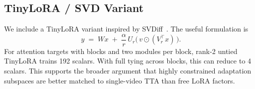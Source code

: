 \subsection{TinyLoRA / SVD Variant}
\label{sec:method_tinylora}

We include a TinyLoRA variant inspired by SVDiff~\citep{han2023svdiff}. The
useful formulation is
\begin{equation}
  y \;=\; Wx \;+\; \frac{\alpha}{r}\, U_r \bigl(\,v \odot (V_r^\top x)\,\bigr).
  \label{eq:tinylora}
\end{equation}
For \backbone attention targets with \nblocks blocks and two modules per block,
rank-2 untied TinyLoRA trains 192 scalars. With full tying across blocks, this
can reduce to 4 scalars. This supports the broader argument that highly
constrained adaptation subspaces are better matched to single-video TTA than
free LoRA factors.
